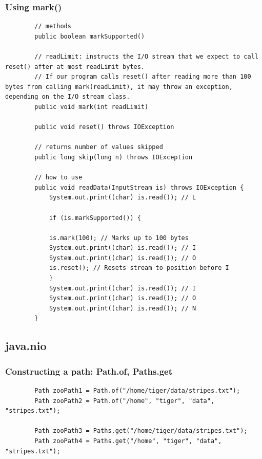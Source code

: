 \documentclass{scrartcl}
\begin{document}
\subsubsection{Using mark()}

    \begin{lstlisting}
        // methods
        public boolean markSupported()

        // readLimit: instructs the I/O stream that we expect to call reset() after at most readLimit bytes.
        // If our program calls reset() after reading more than 100 bytes from calling mark(readLimit), it may throw an exception, depending on the I/O stream class.
        public void mark(int readLimit)

        public void reset() throws IOException

        // returns number of values skipped
        public long skip(long n) throws IOException

        // how to use
        public void readData(InputStream is) throws IOException {
            System.out.print((char) is.read()); // L

            if (is.markSupported()) {

            is.mark(100); // Marks up to 100 bytes
            System.out.print((char) is.read()); // I
            System.out.print((char) is.read()); // O
            is.reset(); // Resets stream to position before I
            }
            System.out.print((char) is.read()); // I
            System.out.print((char) is.read()); // O
            System.out.print((char) is.read()); // N
        }
    \end{lstlisting}



\subsection{java.nio}

\subsubsection{Constructing a path: Path.of, Paths.get}

    \begin{lstlisting}
        Path zooPath1 = Path.of("/home/tiger/data/stripes.txt");
        Path zooPath2 = Path.of("/home", "tiger", "data", "stripes.txt");

        Path zooPath3 = Paths.get("/home/tiger/data/stripes.txt");
        Path zooPath4 = Paths.get("/home", "tiger", "data", "stripes.txt");
    \end{lstlisting}
\end{document}
